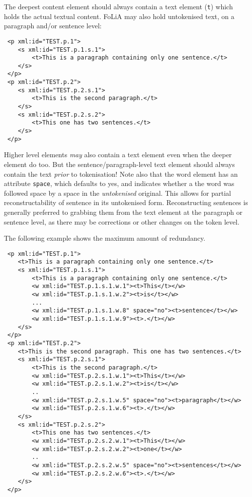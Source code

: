 \documentclass[a4paper,12pt]{article}
\begin{document}
The deepest content element should always contain a text element (\texttt{t}) which holds the actual textual content. FoLiA may also hold untokenised text, on a paragraph and/or sentence level:

\begin{verbatim}
 <p xml:id="TEST.p.1">
    <s xml:id="TEST.p.1.s.1">        
        <t>This is a paragraph containing only one sentence.</t>
    </s>
 </p>
 <p xml:id="TEST.p.2">
    <s xml:id="TEST.p.2.s.1">     
        <t>This is the second paragraph.</t>
    </s>
    <s xml:id="TEST.p.2.s.2">     
        <t>This one has two sentences.</t>
    </s>    
 </p>
\end{verbatim}

Higher level elements \emph{may} also contain a text element even when the deeper element do too. But the sentence/paragraph-level text element should always contain the text \emph{prior} to tokenisation! Note also that the word element has an attribute \texttt{space}, which defaults to yes, and indicates whether a the word was followed space by a space in the \emph{untokenised} original. This allows for partial reconstructability of sentence in its  untokenised form. Reconstructing sentences is generally preferred to grabbing them from the text element at the paragraph or sentence level, as there may be corrections or other changes on the token level. 

The following example shows the maximum amount of redundancy.

\begin{verbatim}
 <p xml:id="TEST.p.1">
    <t>This is a paragraph containing only one sentence.</t>
    <s xml:id="TEST.p.1.s.1">        
        <t>This is a paragraph containing only one sentence.</t>
        <w xml:id="TEST.p.1.s.1.w.1"><t>This</t></w>
        <w xml:id="TEST.p.1.s.1.w.2"><t>is</t></w>
        ...
        <w xml:id="TEST.p.1.s.1.w.8" space="no"><t>sentence</t></w>
        <w xml:id="TEST.p.1.s.1.w.9"><t>.</t></w>
    </s>
 </p>
 <p xml:id="TEST.p.2">
    <t>This is the second paragraph. This one has two sentences.</t>
    <s xml:id="TEST.p.2.s.1">
        <t>This is the second paragraph.</t>
        <w xml:id="TEST.p.2.s.1.w.1"><t>This</t></w>
        <w xml:id="TEST.p.2.s.1.w.2"><t>is</t></w>    
        ..
        <w xml:id="TEST.p.2.s.1.w.5" space="no"><t>paragraph</t></w>    
        <w xml:id="TEST.p.2.s.1.w.6"><t>.</t></w>    
    </s>
    <s xml:id="TEST.p.2.s.2">
        <t>This one has two sentences.</t>
        <w xml:id="TEST.p.2.s.2.w.1"><t>This</t></w>
        <w xml:id="TEST.p.2.s.2.w.2"><t>one</t></w>    
        ..
        <w xml:id="TEST.p.2.s.2.w.5" space="no"><t>sentences</t></w>    
        <w xml:id="TEST.p.2.s.2.w.6"><t>.</t></w>    
    </s>
 </p>
\end{verbatim}
\end{document}
